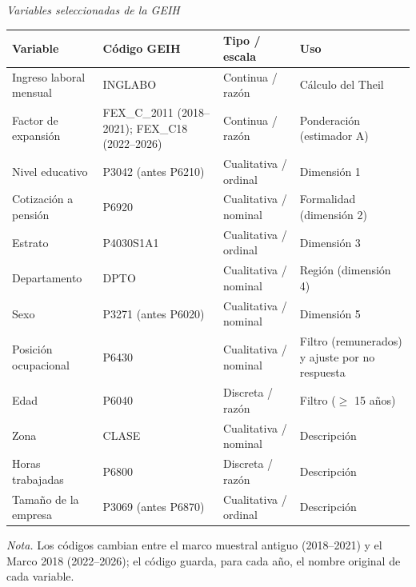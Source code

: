 \documentclass[12pt,letterpaper]{article}
\providecommand{\DIFaddbegin}{}\providecommand{\DIFaddend}{} %
\begin{document}
\DIFaddbegin \begin{table}[H]
  \singlespacing
  \raggedright
  \color{BLUE}{\bfseries Tabla 1 --- versión corregida\par}
  \vspace{0.5\baselineskip}
  {\itshape Variables seleccionadas de la GEIH\par}
  \vspace{0.5\baselineskip}
  \small
  \renewcommand{\arraystretch}{1.35}
  \begin{tabular}{@{}>{\raggedright\arraybackslash}p{1.45in}
                    >{\raggedright\arraybackslash}p{1.45in}
                    >{\raggedright\arraybackslash}p{1.35in}
                    >{\raggedright\arraybackslash}p{1.65in}@{}}
    \toprule
    Variable & Código GEIH & Tipo / escala & Uso \\
    \midrule
    Ingreso laboral mensual & INGLABO & Continua / razón & Cálculo del Theil \\
    Factor de expansión & FEX\_C\_2011 (2018--2021); FEX\_C18 (2022--2026) & Continua / razón & Ponderación (estimador A) \\
    Nivel educativo & P3042 (antes P6210) & Cualitativa / ordinal & Dimensión 1 \\
    Cotización a pensión & P6920 & Cualitativa / nominal & Formalidad (dimensión 2) \\
    Estrato & P4030S1A1 & Cualitativa / ordinal & Dimensión 3 \\
    Departamento & DPTO & Cualitativa / nominal & Región (dimensión 4) \\
    Sexo & P3271 (antes P6020) & Cualitativa / nominal & Dimensión 5 \\
    Posición ocupacional & P6430 & Cualitativa / nominal & Filtro (remunerados) y ajuste por no respuesta \\
    Edad & P6040 & Discreta / razón & Filtro ($\geq$ 15 años) \\
    Zona & CLASE & Cualitativa / nominal & Descripción \\
    Horas trabajadas & P6800 & Discreta / razón & Descripción \\
    Tamaño de la empresa & P3069 (antes P6870) & Cualitativa / ordinal & Descripción \\
    \bottomrule
  \end{tabular}

  \vspace{0.3\baselineskip}
  {\itshape Nota.} Los códigos cambian entre el marco muestral antiguo (2018--2021) y el Marco 2018 (2022--2026); el código guarda, para cada año, el nombre original de cada variable.
\end{table}
\DIFaddend 
\end{document}
